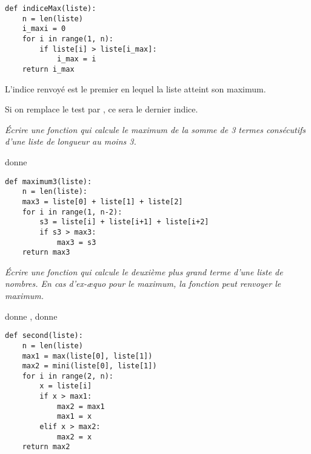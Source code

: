 \begin{Answer}
\begin{lstlisting}
def indiceMax(liste):
    n = len(liste)
    i_maxi = 0
    for i in range(1, n):
        if liste[i] > liste[i_max]:
            i_max = i
    return i_max
\end{lstlisting}
L'indice renvoyé est le premier en lequel la liste atteint son maximum.

Si on remplace le test par , ce sera le dernier indice.
\end{Answer}
\begin{Exercise}[title=Sommes de 3 termes]
\it Écrire une fonction  qui calcule le maximum de la somme de 3 termes consécutifs d'une liste de longueur au moins 3.

 donne 
\end{Exercise}
\begin{Answer}
\begin{lstlisting}
def maximum3(liste):
    n = len(liste):
    max3 = liste[0] + liste[1] + liste[2]
    for i in range(1, n-2):
        s3 = liste[i] + liste[i+1] + liste[i+2]
        if s3 > max3:
            max3 = s3
    return max3
\end{lstlisting}
\end{Answer}
\begin{Exercise}[title=Deuxième valeur]
\it Écrire une fonction  qui calcule le deuxième plus grand terme d'une liste de nombres. En cas d'ex-æquo pour le maximum, la fonction peut renvoyer le maximum.

 donne ,  donne 
\end{Exercise}
\begin{Answer}
\begin{lstlisting}
def second(liste):
    n = len(liste)
    max1 = max(liste[0], liste[1])
    max2 = mini(liste[0], liste[1])
    for i in range(2, n):
        x = liste[i]
        if x > max1:
            max2 = max1
            max1 = x
        elif x > max2:
            max2 = x
    return max2
\end{lstlisting}
\end{Answer}

